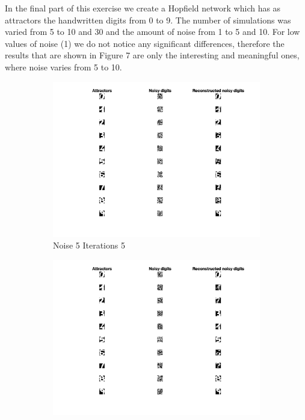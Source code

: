 \documentclass[11pt,conference,compsoc]{IEEEtran}
\begin{document}
In the final part of this exercise we create a Hopfield network which has as attractors the handwritten digits from 0 to 9. The number of simulations was varied from 5 to 10 and 30 and the amount of noise from 1 to 5 and 10. For low values of noise (1) we do not notice any significant differences, therefore the results that are shown in Figure 7 are only the interesting and meaningful ones, where noise varies from 5 to 10. 

\begin{figure}[]
    \begin{subfigure}{0.32\linewidth}
        \includegraphics[width=\linewidth]{images/noise5_iter5.png}
        \caption{Noise 5 Iterations 5}
    \end{subfigure}
    \begin{subfigure}{0.32\linewidth}
        \includegraphics[width=\linewidth]{images/noise5_iter10.png}

\end{subfigure}
\end{figure}
\end{document}
